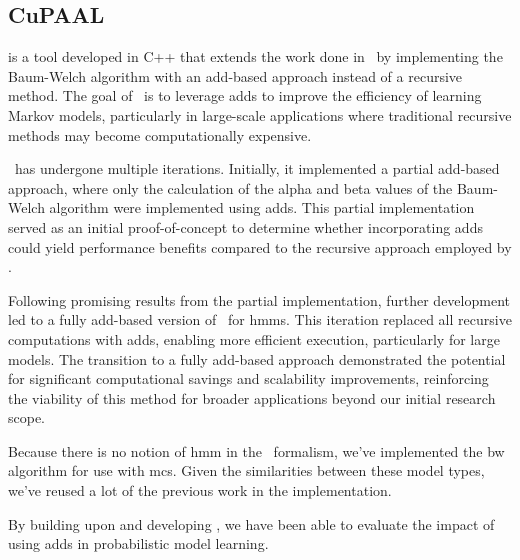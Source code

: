 \subsection{CuPAAL}\label{subsec:cupaal}
\Cupaal is a tool developed in C++ that extends the work done in \Jajapy\ by implementing the Baum-Welch algorithm with an \gls{add}-based approach instead of a recursive method.
The goal of \Cupaal\ is to leverage \glspl{add} to improve the efficiency of learning Markov models, particularly in large-scale applications where traditional recursive methods may become computationally expensive.

\Cupaal\ has undergone multiple iterations.
Initially, it implemented a partial \gls{add}-based approach, where only the calculation of the alpha and beta values of the Baum-Welch algorithm were implemented using \glspl{add}.
This partial implementation served as an initial proof-of-concept to determine whether incorporating \glspl{add} could yield performance benefits compared to the recursive approach employed by \Jajapy.

Following promising results from the partial implementation, further development led to a fully \gls{add}-based version of \Cupaal\ for \glspl{hmm}.
This iteration replaced all recursive computations with \glspl{add}, enabling more efficient execution, particularly for large models.
The transition to a fully \gls{add}-based approach demonstrated the potential for significant computational savings and scalability improvements, reinforcing the viability of this method for broader applications beyond our initial research scope.

Because there is no notion of \gls{hmm} in the \Prism\ formalism, we've implemented the \gls{bw} algorithm for use with \glspl{mc}.
Given the similarities between these model types, we've reused a lot of the previous work in the implementation.

By building upon \Jajapy and developing \Cupaal, we have been able to evaluate the impact of using \glspl{add} in probabilistic model learning.
